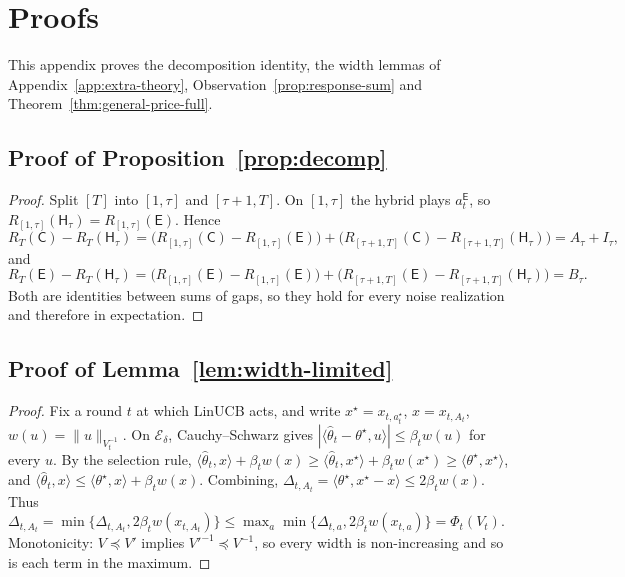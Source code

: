 \documentclass[anon]{alt2027} %
\newcommand{\Cold}{\mathsf{C}}
\newcommand{\Exp}{\mathsf{E}}
\newcommand{\Hyb}{\mathsf{H}}
\newcommand{\wid}{w}
\begin{document}
\section{Proofs}
\label{app:proofs}

This appendix proves the decomposition identity, the width lemmas of
Appendix~\ref{app:extra-theory}, Observation~\ref{prop:response-sum} and
Theorem~\ref{thm:general-price-full}.

\subsection{Proof of Proposition~\ref{prop:decomp}}
\label{app:proof-decomp}

\begin{proof}
Split $[T]$ into $[1,\tau]$ and $[\tau+1,T]$. On $[1,\tau]$ the hybrid plays
$a_t^{\Exp}$, so $R_{[1,\tau]}(\Hyb_\tau)=R_{[1,\tau]}(\Exp)$. Hence
\[
R_T(\Cold)-R_T(\Hyb_\tau)
=\bigl(R_{[1,\tau]}(\Cold)-R_{[1,\tau]}(\Exp)\bigr)
+\bigl(R_{[\tau+1,T]}(\Cold)-R_{[\tau+1,T]}(\Hyb_\tau)\bigr)
=A_\tau+I_\tau ,
\]
and
\[
R_T(\Exp)-R_T(\Hyb_\tau)
=\bigl(R_{[1,\tau]}(\Exp)-R_{[1,\tau]}(\Exp)\bigr)
+\bigl(R_{[\tau+1,T]}(\Exp)-R_{[\tau+1,T]}(\Hyb_\tau)\bigr)
=B_\tau .
\]
Both are identities between sums of gaps, so they hold for every noise
realization and therefore in expectation.
\end{proof}

\subsection{Proof of Lemma~\ref{lem:width-limited}}
\label{app:proof-width}

\begin{proof}
Fix a round $t$ at which LinUCB acts, and write $x^\star=x_{t,a_t^\star}$,
$x=x_{t,A_t}$, $\wid(u)=\|u\|_{V_t^{-1}}$. On $\mathcal E_\delta$, Cauchy--Schwarz
gives $|\langle\widehat\theta_t-\theta^\star,u\rangle|\le\beta_t\wid(u)$ for
every $u$. By the selection rule,
$\langle\widehat\theta_t,x\rangle+\beta_t\wid(x)\ge\langle\widehat\theta_t,x^\star\rangle+\beta_t\wid(x^\star)\ge\langle\theta^\star,x^\star\rangle$,
and $\langle\widehat\theta_t,x\rangle\le\langle\theta^\star,x\rangle+\beta_t\wid(x)$.
Combining, $\Delta_{t,A_t}=\langle\theta^\star,x^\star-x\rangle\le2\beta_t\wid(x)$.
Thus $\Delta_{t,A_t}=\min\{\Delta_{t,A_t},2\beta_t\wid(x_{t,A_t})\}\le\max_a\min\{\Delta_{t,a},2\beta_t\wid(x_{t,a})\}=\Phi_t(V_t)$.
Monotonicity: $V\preceq V'$ implies $V'^{-1}\preceq V^{-1}$, so every width is
non-increasing and so is each term in the maximum.
\end{proof}
\end{document}
